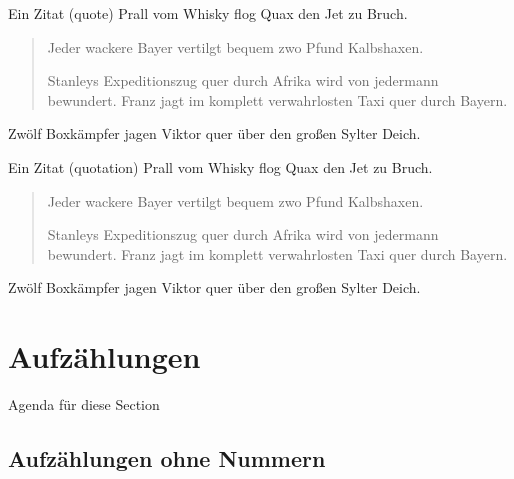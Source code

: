 	\begin{frame}{Ein Zitat (quote)}
		Prall vom Whisky flog Quax den Jet zu Bruch.

		\begin{quote}
			Jeder wackere Bayer vertilgt bequem zwo Pfund Kalbshaxen.

			Stanleys Expeditionszug quer durch Afrika wird von jedermann bewundert.
			Franz jagt im komplett verwahrlosten Taxi quer durch Bayern.
		\end{quote}

		Zwölf Boxkämpfer jagen Viktor quer über den großen Sylter Deich.
	\end{frame}


	\begin{frame}{Ein Zitat (quotation)}
		Prall vom Whisky flog Quax den Jet zu Bruch.

		\begin{quotation}
			Jeder wackere Bayer vertilgt bequem zwo Pfund Kalbshaxen.

			Stanleys Expeditionszug quer durch Afrika wird von jedermann bewundert.
			Franz jagt im komplett verwahrlosten Taxi quer durch Bayern.
		\end{quotation}

		Zwölf Boxkämpfer jagen Viktor quer über den großen Sylter Deich.
	\end{frame}


	\section{Aufzählungen}

	\begin{frame}{Agenda für diese Section}
		\tableofcontents[currentsection]
	\end{frame}


	\subsection{Aufzählungen ohne Nummern}

